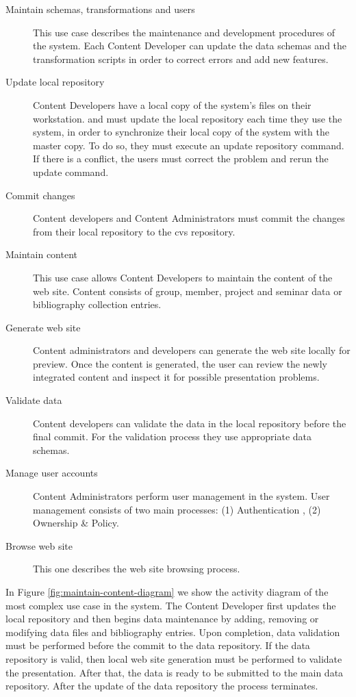 \documentclass[10pt]{article}
\begin{document}
\begin{description}
\item[Maintain schemas, transformations and users] This use case describes the 
maintenance and development procedures of the system. Each Content Developer can
update the data schemas and the transformation scripts in order to correct errors 
and add new features.

\item[Update local repository] Content Developers have a local copy of the system's files on their workstation. 
and must update the local repository each time they use the system, in order to synchronize their local copy of the system with the master copy. 
To do so, they must execute an update 
repository command. If there is a conflict, the users must correct the problem 
and rerun the update command.

\item[Commit changes] Content developers and Content Administrators must commit 
the changes from their local repository to the {\sc cvs} repository.

\item[Maintain content] This use case allows Content 
Developers to maintain the content of the web site. 
Content consists of group, member, project and seminar data or bibliography 
collection entries.

\item[Generate web site] Content administrators and developers can generate the 
web site locally for preview. Once the content is generated, 
the user can review the newly integrated content and inspect it
for possible presentation problems.

\item[Validate data] Content developers can validate the data in the local 
repository before the final commit. For the validation process
they use appropriate data schemas.

\item[Manage user accounts] Content Administrators perform user management in the 
system. User management consists of two main processes: 
(1) Authentication , (2) Ownership \& Policy.

\item[Browse web site] This one describes the web site browsing process.

\end{description} 

In Figure \ref{fig:maintain-content-diagram} we show the activity diagram of the 
most complex use case in the system. The Content Developer first updates the 
local repository and then begins data maintenance by adding, 
removing or modifying data files and bibliography entries. Upon completion, data 
validation must be performed before the commit to the data repository. If the data 
repository is valid, then local web site generation must be performed to validate the 
presentation. After that, the data is ready to be submitted to the main 
data repository. After the update of the data repository the process terminates.
\end{document}
